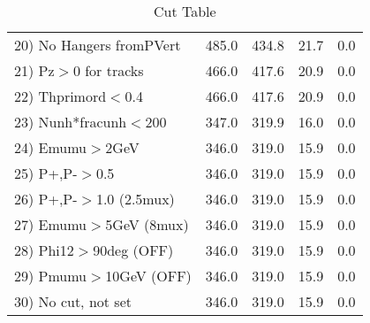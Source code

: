 \begin{table}[h!]
\begin{tabular}{||l||r|r|r|r||}
 20) No Hangers fromPVert &       485.0 &       434.8 &        21.7 &         0.0 \\
 21) Pz$>$0 for tracks    &       466.0 &       417.6 &        20.9 &         0.0 \\
 22) Thprimord$<$0.4      &       466.0 &       417.6 &        20.9 &         0.0 \\
 23) Nunh*fracunh$<$200   &       347.0 &       319.9 &        16.0 &         0.0 \\
 24) Emumu$>$2GeV         &       346.0 &       319.0 &        15.9 &         0.0 \\
 25) P+,P-$>$0.5          &       346.0 &       319.0 &        15.9 &         0.0 \\
 26) P+,P-$>$1.0 (2.5mux) &       346.0 &       319.0 &        15.9 &         0.0 \\
 27) Emumu$>$5GeV  (8mux) &       346.0 &       319.0 &        15.9 &         0.0 \\
 28) Phi12$>$90deg  (OFF) &       346.0 &       319.0 &        15.9 &         0.0 \\
 29) Pmumu$>$10GeV  (OFF) &       346.0 &       319.0 &        15.9 &         0.0 \\
 30) No cut, not set      &       346.0 &       319.0 &        15.9 &         0.0 \\
 \hline
 \hline
 \end{tabular}
 \caption{Cut Table \cohrp  }
 \label{tab-cut_crhop}
 \end{table}
